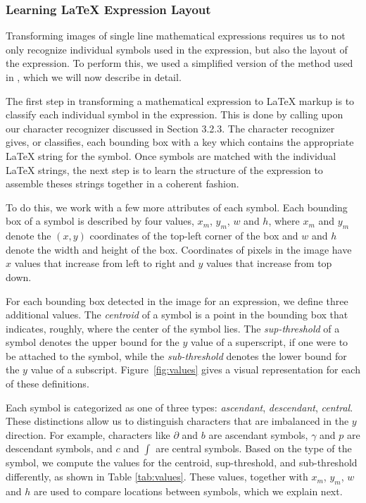 \documentclass[10pt]{IEEEtran}
\newcommand{\latex}{\LaTeX\xspace}
\begin{document}
\subsubsection{Learning \latex Expression Layout}

Transforming images of single line mathematical expressions requires us to not only recognize individual symbols used in the expression, but also the layout of the expression. To perform this, we used a simplified version of the method used in \cite{4}, which we will now describe in detail. 

The first step in transforming a mathematical expression to \latex markup is to classify each individual symbol in the expression. This is done by calling upon our character recognizer discussed in Section 3.2.3. The character recognizer gives, or classifies, each bounding box with a key which contains the appropriate \latex string for the symbol. Once symbols are matched with the individual \latex strings, the next step is to learn the structure of the expression to assemble theses strings together in a coherent fashion.
 
To do this, we work with a few more attributes of each symbol. Each bounding box of a symbol is described by four values, $x_m$, $y_m$, $w$ and $h$, where $x_m$ and $y_m$ denote the $(x,y)$ coordinates of the top-left corner of the box and $w$ and $h$ denote the width and height of the box. Coordinates of pixels in the image have $x$ values that increase from left to right and $y$ values that increase from top down.

For each bounding box detected in the image for an expression, we define three additional values. The \textit{centroid} of a symbol is a point in the bounding box that indicates, roughly, where the center of the symbol lies. The \textit{sup-threshold} of a symbol denotes the upper bound for the $y$ value of a superscript, if one were to be attached to the symbol, while the \textit{sub-threshold} denotes the lower bound for the $y$ value of a subscript. Figure~\ref{fig:values} gives a visual representation for each of these definitions. 

Each symbol is categorized as one of three types: \textit{ascendant}, \textit{descendant}, \textit{central}. These distinctions allow us to distinguish characters that are imbalanced in the $y$ direction. For example, characters like $\partial$ and $b$ are ascendant symbols, $\gamma$ and $p$ are descendant symbols, and $c$ and $\int$ are central symbols. Based on the type of the symbol, we compute the values for the centroid, sup-threshold, and sub-threshold differently, as shown in Table \ref{tab:values}. These values, together with $x_m$, $y_m$, $w$ and $h$ are used to compare locations between symbols, which we explain next.
\end{document}
